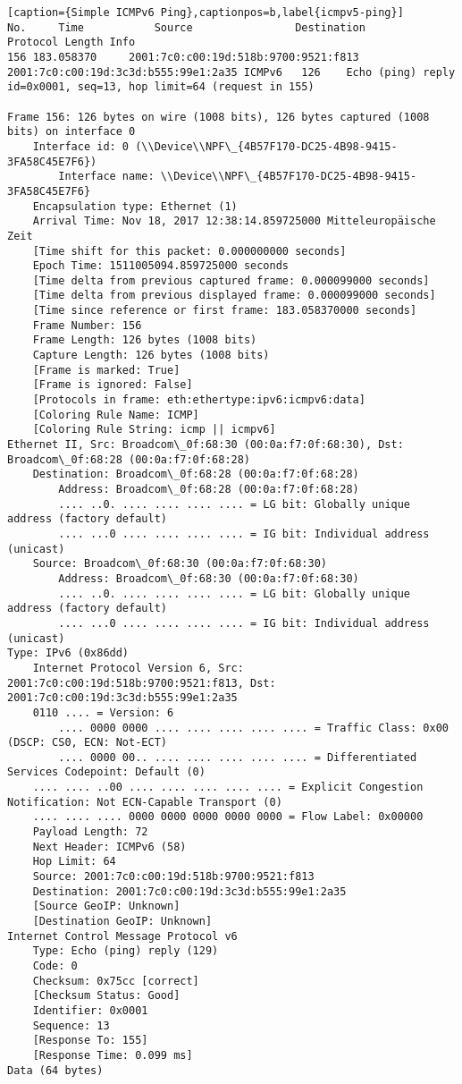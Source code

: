 \begin{lstlisting}[caption={Simple ICMPv6 Ping},captionpos=b,label{icmpv5-ping}]
No.     Time           Source                Destination           Protocol Length Info
156 183.058370     2001:7c0:c00:19d:518b:9700:9521:f813 2001:7c0:c00:19d:3c3d:b555:99e1:2a35 ICMPv6   126    Echo (ping) reply id=0x0001, seq=13, hop limit=64 (request in 155)

Frame 156: 126 bytes on wire (1008 bits), 126 bytes captured (1008 bits) on interface 0
	Interface id: 0 (\\Device\\NPF\_{4B57F170-DC25-4B98-9415-3FA58C45E7F6})
		Interface name: \\Device\\NPF\_{4B57F170-DC25-4B98-9415-3FA58C45E7F6}
	Encapsulation type: Ethernet (1)
	Arrival Time: Nov 18, 2017 12:38:14.859725000 Mitteleuropäische Zeit
	[Time shift for this packet: 0.000000000 seconds]
	Epoch Time: 1511005094.859725000 seconds
	[Time delta from previous captured frame: 0.000099000 seconds]
	[Time delta from previous displayed frame: 0.000099000 seconds]
	[Time since reference or first frame: 183.058370000 seconds]
	Frame Number: 156
	Frame Length: 126 bytes (1008 bits)
	Capture Length: 126 bytes (1008 bits)
	[Frame is marked: True]
	[Frame is ignored: False]
	[Protocols in frame: eth:ethertype:ipv6:icmpv6:data]
	[Coloring Rule Name: ICMP]
	[Coloring Rule String: icmp || icmpv6]
Ethernet II, Src: Broadcom\_0f:68:30 (00:0a:f7:0f:68:30), Dst: Broadcom\_0f:68:28 (00:0a:f7:0f:68:28)
	Destination: Broadcom\_0f:68:28 (00:0a:f7:0f:68:28)
		Address: Broadcom\_0f:68:28 (00:0a:f7:0f:68:28)
		.... ..0. .... .... .... .... = LG bit: Globally unique address (factory default)
		.... ...0 .... .... .... .... = IG bit: Individual address (unicast)
	Source: Broadcom\_0f:68:30 (00:0a:f7:0f:68:30)
		Address: Broadcom\_0f:68:30 (00:0a:f7:0f:68:30)
		.... ..0. .... .... .... .... = LG bit: Globally unique address (factory default)
		.... ...0 .... .... .... .... = IG bit: Individual address (unicast)
Type: IPv6 (0x86dd)
	Internet Protocol Version 6, Src: 2001:7c0:c00:19d:518b:9700:9521:f813, Dst: 2001:7c0:c00:19d:3c3d:b555:99e1:2a35
	0110 .... = Version: 6
		.... 0000 0000 .... .... .... .... .... = Traffic Class: 0x00 (DSCP: CS0, ECN: Not-ECT)
		.... 0000 00.. .... .... .... .... .... = Differentiated Services Codepoint: Default (0)
	.... .... ..00 .... .... .... .... .... = Explicit Congestion Notification: Not ECN-Capable Transport (0)
	.... .... .... 0000 0000 0000 0000 0000 = Flow Label: 0x00000
	Payload Length: 72
	Next Header: ICMPv6 (58)
	Hop Limit: 64
	Source: 2001:7c0:c00:19d:518b:9700:9521:f813
	Destination: 2001:7c0:c00:19d:3c3d:b555:99e1:2a35
	[Source GeoIP: Unknown]
	[Destination GeoIP: Unknown]
Internet Control Message Protocol v6
	Type: Echo (ping) reply (129)
	Code: 0
	Checksum: 0x75cc [correct]
	[Checksum Status: Good]
	Identifier: 0x0001
	Sequence: 13
	[Response To: 155]
	[Response Time: 0.099 ms]
Data (64 bytes)
\end{lstlisting}
